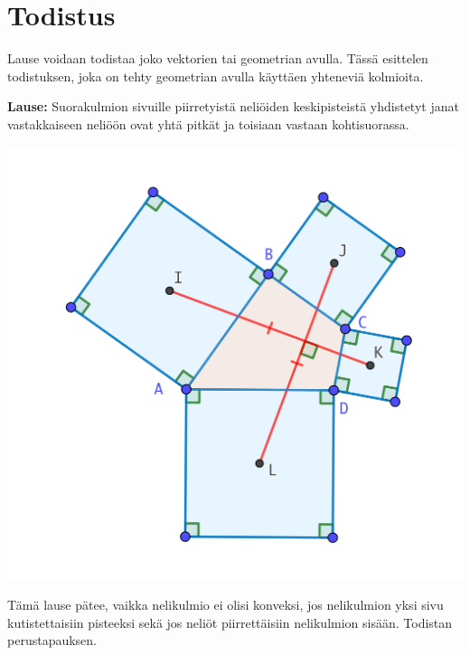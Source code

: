 \documentclass{scrartcl}
\begin{document}
\pagebreak
\section{Todistus}
Lause voidaan todistaa joko vektorien tai geometrian avulla. Tässä esittelen todistuksen, joka on tehty geometrian avulla käyttäen yhteneviä kolmioita.

\medskip
\textbf{Lause:} Suorakulmion sivuille piirretyistä neliöiden keskipisteistä yhdistetyt janat vastakkaiseen neliöön ovat yhtä pitkät ja toisiaan vastaan kohtisuorassa. 
\begin{center}
    \includegraphics[scale=0.3]{todistuskuva}
\end{center}

Tämä lause pätee, vaikka nelikulmio ei olisi konveksi, jos nelikulmion yksi sivu kutistettaisiin pisteeksi sekä jos neliöt piirrettäisiin nelikulmion sisään. Todistan perustapauksen.
\end{document}
